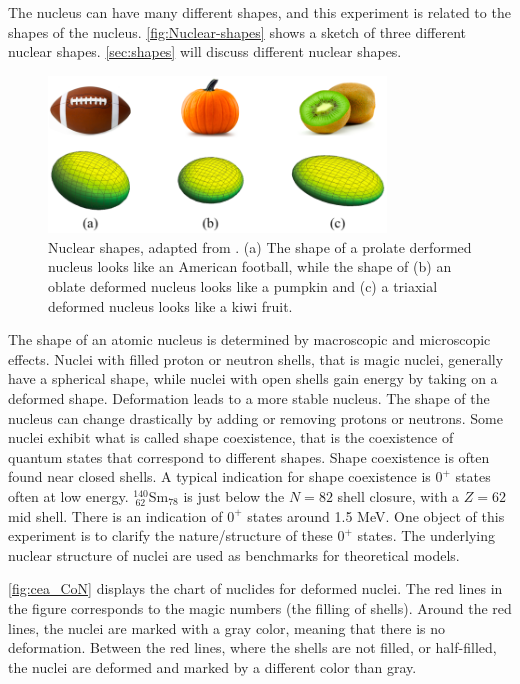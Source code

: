 \documentclass[twoside,english]{uiofysmaster/uiofysmaster}
\let\orgautoref\autoref
\renewcommand{\autoref}
        {%
		 \def\sectionautorefname{Section}%
		 \def\subsectionautorefname{Section}%
		 \def\subsubsectionautorefname{Section}%
		 \def\chapterautorefname{Chapter}%
          \orgautoref}
\begin{document}
The nucleus can have many different shapes, and this experiment is related to the shapes of the nucleus. 
\autoref{fig:Nuclear-shapes} shows a sketch of three different nuclear shapes. 
\autoref{sec:shapes} will discuss different nuclear shapes.

\begin{figure}[htb]
	\centering
	\includegraphics[width=0.8\textwidth]{Images/nuclear-shapes-v2.png}
	\caption{Nuclear shapes, adapted from \cite{MSU-shapes}. 
	(a) The shape of a prolate derformed nucleus looks like an American football, while the shape of (b) an oblate deformed nucleus looks like a pumpkin and (c) a triaxial deformed nucleus looks like a kiwi fruit.}
	\label{fig:Nuclear-shapes}
\end{figure}

The shape of an atomic nucleus is determined by macroscopic and microscopic effects. 
Nuclei with filled proton or neutron shells, that is magic nuclei, generally have a spherical shape, while nuclei with open shells gain energy by taking on a deformed shape.
Deformation leads to a more stable nucleus.
The shape of the nucleus can change drastically by adding or removing protons or neutrons.
Some nuclei exhibit what is called shape coexistence, that is the coexistence of quantum states that correspond to different shapes.
Shape coexistence is often found near closed shells. 
A typical indication for shape coexistence is $0^+$ states often at low energy. 
$^{140}_{~62}$Sm$_{78}$ is just below the $N = 82$ shell closure, with a $Z = 62$ mid shell. 
There is an indication of $0^+$ states around 1.5 MeV. 
One object of this experiment is to clarify the nature/structure of these $0^+$ states. 
The underlying nuclear structure of nuclei are used as benchmarks for theoretical models.

\autoref{fig:cea_CoN} displays the chart of nuclides for deformed nuclei. 
The red lines in the figure corresponds to the magic numbers (the filling of shells). 
Around the red lines, the nuclei are marked with a gray color, meaning that there is no deformation. 
Between the red lines, where the shells are not filled, or half-filled, the nuclei are deformed and marked by a different color than gray. 
\end{document}
